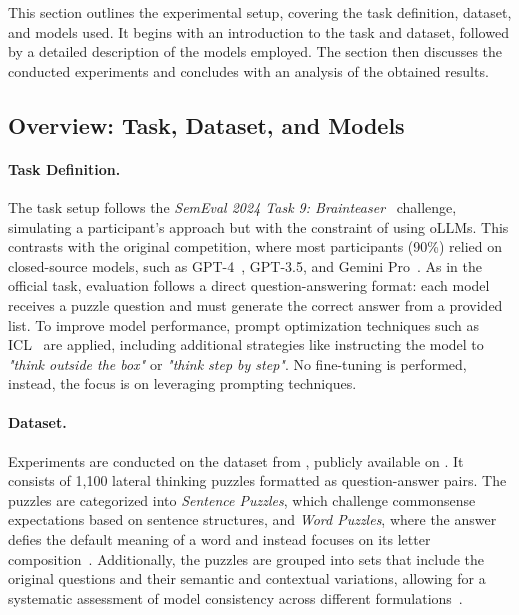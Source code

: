 This section outlines the experimental setup, covering the task definition, dataset, and models used. It begins with an introduction to the task and dataset, followed by a detailed description of the models employed. The section then discusses the conducted experiments and concludes with an analysis of the obtained results.

\subsection{Overview: Task, Dataset, and Models}

\paragraph{Task Definition.}
The task setup follows the \textit{SemEval 2024 Task 9: Brainteaser}~\cite{jiangBRAINTEASERLateralThinking2023} challenge, simulating a participant's approach but with the constraint of using \acp{oLLM}. This contrasts with the original competition, where most participants (90\%) relied on closed-source models, such as \acs{GPT}-4~\cite{openaiGPT4TechnicalReport2024}, \acs{GPT}-3.5, and Gemini Pro~\cite{teamGeminiFamilyHighly2024}. As in the official task, evaluation follows a direct question-answering format: each model receives a puzzle question and must generate the correct answer from a provided list. To improve model performance, prompt optimization techniques such as \ac{ICL}~\cite{brownLanguageModelsAre2020} are applied, including additional strategies like instructing the model to \textit{"think outside the box"} or \textit{"think step by step"}. No fine-tuning is performed, instead, the focus is on leveraging prompting techniques.

\paragraph{Dataset.}
Experiments are conducted on the dataset from , publicly available on . It consists of 1,100 lateral thinking puzzles formatted as question-answer pairs. The puzzles are categorized into \textit{Sentence Puzzles}, which challenge commonsense expectations based on sentence structures, and \textit{Word Puzzles}, where the answer defies the default meaning of a word and instead focuses on its letter composition~\cite{jiangBRAINTEASERLateralThinking2023}. Additionally, the puzzles are grouped into sets that include the original questions and their semantic and contextual variations, allowing for a systematic assessment of model consistency across different formulations~\cite{jiangBRAINTEASERLateralThinking2023}.

